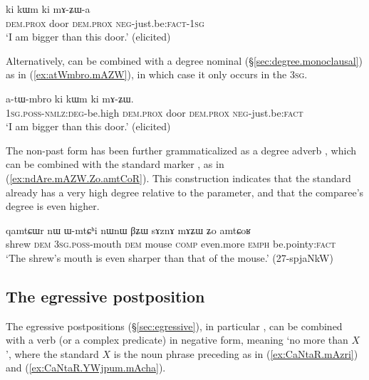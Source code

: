 \begin{exe}
\ex \label{ex:mAZWa}
 \gll ki kɯm ki mɤ-ʑɯ-a \\
\textsc{dem}.\textsc{prox} door \textsc{dem}.\textsc{prox} \textsc{neg}-just.be:\textsc{fact}-\textsc{1sg} \\
\glt `I am bigger than this door.' (elicited)
\end{exe}

Alternatively,  can be combined with a degree nominal (§\ref{sec:degree.monoclausal}) as in (\ref{ex:atWmbro.mAZW}), in which case it only occurs in the \textsc{3sg}.

\begin{exe}
\ex \label{ex:atWmbro.mAZW}
 \gll a-tɯ-mbro ki kɯm ki mɤ-ʑɯ. \\
 \textsc{1sg}.\textsc{poss}-\textsc{nmlz}:\textsc{deg}-be.high \textsc{dem}.\textsc{prox} door \textsc{dem}.\textsc{prox} \textsc{neg}-just.be:\textsc{fact} \\
\glt `I am bigger than this door.' (elicited)
\end{exe}

The non-past form  has been further grammaticalized as a degree adverb , which can be combined with the standard marker , as in (\ref{ex:ndAre.mAZW.Zo.amtCoR}). This construction indicates that the standard already has a very high degree relative to the parameter, and that the comparee's degree is even higher.

\begin{exe}
\ex \label{ex:ndAre.mAZW.Zo.amtCoR}
 \gll qamtɕɯr nɯ ɯ-mtɕʰi nɯnɯ βʑɯ sɤznɤ mɤʑɯ ʑo amtɕoʁ \\
 shrew \textsc{dem} \textsc{3sg}.\textsc{poss}-mouth \textsc{dem} mouse \textsc{comp} even.more \textsc{emph} be.pointy:\textsc{fact} \\
\glt `The shrew's mouth is even sharper than that of the mouse.' (27-spjaNkW)
\end{exe}

\subsection{The egressive postposition } \label{sec:egressive.comparative}
The egressive postpositions (§\ref{sec:egressive}), in particular , can be combined with a verb (or a complex predicate) in negative form, meaning `no more than $X$', where the standard $X$ is the noun phrase preceding  as in (\ref{ex:CaNtaR.mAzri}) and (\ref{ex:CaNtaR.YWjpum.mAcha}).


